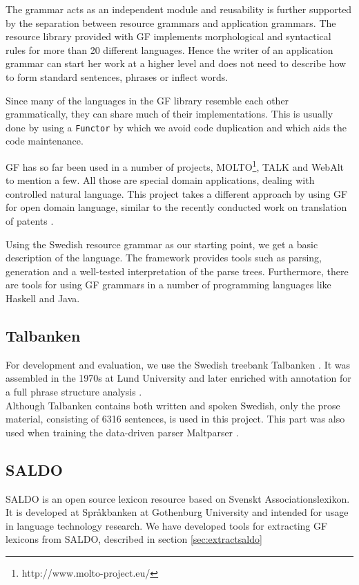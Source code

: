 \documentclass[10pt, a4paper]{article}
\begin{document}
The grammar acts as an independent module and reusability is further supported
by the separation between resource grammars and application grammars. The
resource library provided with GF implements morphological and syntactical
rules for more than 20 different languages.  Hence the writer of an application
grammar can start her work at a higher level and does not need to describe how
to form standard sentences, phrases or inflect words.

Since many of the languages in the GF library resemble each other grammatically,
they can share much of their implementations. This is usually done by using a
\verb|Functor| by which we avoid code duplication and which aids the code maintenance.

GF has so far been used in a number of projects,
MOLTO\footnote{http://www.molto-project.eu/}, TALK \cite{talk}
and WebAlt \cite{webalt} to mention a few. 
All those are special domain applications, dealing with controlled natural
language.
This project takes a different approach by using GF for open domain language,
similar to the recently conducted work on translation of patents \cite{patent}.

Using the Swedish resource grammar as our starting
point, we get a basic description of the language. The framework provides
tools such as parsing, generation and
a well-tested interpretation of the parse trees. Furthermore, there are tools
for using GF grammars in a number of programming languages like Haskell
and Java. 



\subsection{Talbanken}
For development and evaluation, we use the Swedish treebank
Talbanken \cite{talbanken}.
It was assembled in the 1970s at Lund University and later
enriched with annotation for a full phrase structure analysis \cite{talbanken05}.  \\
Although Talbanken contains both written and spoken Swedish,
only the prose material, consisting of 6316 sentences, is used in this
project.
This part was also used when training the data-driven parser Maltparser \cite{malt}. \\

\subsection{SALDO}
SALDO \cite{saldo} is an open source lexicon resource
based on Svenskt Associationslexikon. It is
developed at Spr{\aa}kbanken at Gothenburg University
and intended for usage in language technology
research. 
We have developed tools for extracting GF lexicons
from SALDO, described in section \ref{sec:extractsaldo}
\end{document}

